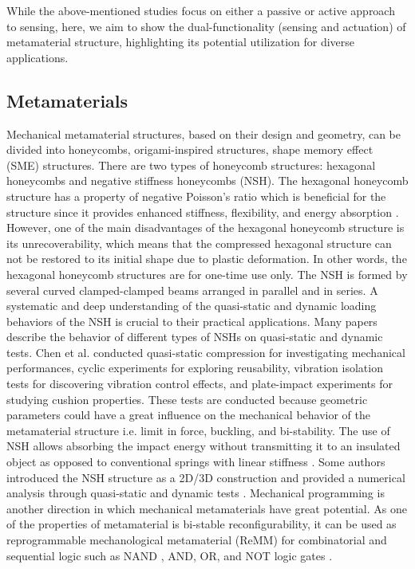 \documentclass[lettersize,journal]{IEEEtran}
\begin{document}
While the above-mentioned studies focus on either a passive or active approach to sensing, here, we aim to show the dual-functionality (sensing and actuation) of metamaterial structure, highlighting its potential utilization for diverse applications. 

\subsection{Metamaterials}

Mechanical metamaterial structures, based on their design and geometry, can be divided into honeycombs, origami-inspired structures, shape memory effect (SME) structures. There are two types of honeycomb structures: hexagonal honeycombs and negative stiffness honeycombs (NSH). The hexagonal honeycomb structure has a property of negative Poisson's ratio which is beneficial for the structure since it provides enhanced stiffness, flexibility, and energy absorption \cite{guo20213d}. However, one of the main disadvantages of the hexagonal honeycomb structure is its unrecoverability, which means that the compressed hexagonal structure can not be restored to its initial shape due to plastic deformation. In other words, the hexagonal honeycomb structures are for one-time use only. The NSH is formed by several curved clamped-clamped beams arranged in parallel and in series. A systematic and deep understanding of the quasi-static and dynamic loading behaviors of the NSH is crucial to their practical applications. Many papers describe the behavior of different types of NSHs on quasi-static and dynamic tests. Chen et al. \cite{chen2021novel} conducted quasi-static compression for investigating mechanical performances, cyclic experiments for exploring reusability, vibration isolation tests for discovering vibration control effects, and plate-impact experiments for studying cushion properties. These tests are conducted because geometric parameters could have a great influence on the mechanical behavior of the metamaterial structure i.e. limit in force, buckling, and bi-stability. The use of NSH allows absorbing the impact energy without transmitting it to an insulated object as opposed to conventional springs with linear stiffness \cite{correa2015negative, ganilova2018application, debeau2018impact}. Some authors introduced the NSH structure as a 2D/3D construction and provided a numerical analysis through quasi-static and dynamic tests \cite{ren2018mechanical, tan2019novel}. Mechanical programming is another direction in which mechanical metamaterials have great potential. As one of the properties of metamaterial is bi-stable reconfigurability, it can be used as reprogrammable mechanological metamaterial (ReMM) for combinatorial and sequential logic such as NAND \cite{mei2021mechanical}, AND, OR, and NOT logic gates \cite{meng2021bistability}.
\end{document}
